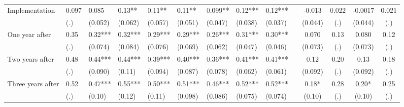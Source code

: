 \begin{tabular}{lccccrrrrrcccc}
Implementation & \multicolumn{1}{l}{0.097} & \multicolumn{1}{l}{0.085} & \multicolumn{1}{l}{0.13**} & \multicolumn{1}{l}{0.11**} & \multicolumn{1}{l}{0.11**} & \multicolumn{1}{l}{0.099**} & \multicolumn{1}{l}{0.12***} & \multicolumn{1}{l}{0.12***} &       & -0.013 & 0.022 & -0.0017 & 0.021 \\
      & \multicolumn{1}{l}{(.)} & \multicolumn{1}{l}{(0.052)} & \multicolumn{1}{l}{(0.062)} & \multicolumn{1}{l}{(0.057)} & \multicolumn{1}{l}{(0.051)} & \multicolumn{1}{l}{(0.047)} & \multicolumn{1}{l}{(0.038)} & \multicolumn{1}{l}{(0.037)} &       & (0.044) & (.)   & (0.044) & (.) \\
One year after & \multicolumn{1}{l}{0.35} & \multicolumn{1}{l}{0.32***} & \multicolumn{1}{l}{0.32***} & \multicolumn{1}{l}{0.29***} & \multicolumn{1}{l}{0.29***} & \multicolumn{1}{l}{0.26***} & \multicolumn{1}{l}{0.31***} & \multicolumn{1}{l}{0.30***} &       & 0.070 & 0.13  & 0.080 & 0.12 \\
      & \multicolumn{1}{l}{(.)} & \multicolumn{1}{l}{(0.074)} & \multicolumn{1}{l}{(0.084)} & \multicolumn{1}{l}{(0.076)} & \multicolumn{1}{l}{(0.069)} & \multicolumn{1}{l}{(0.062)} & \multicolumn{1}{l}{(0.047)} & \multicolumn{1}{l}{(0.046)} &       & (0.073) & (.)   & (0.073) & (.) \\
Two years after & \multicolumn{1}{l}{0.48} & \multicolumn{1}{l}{0.44***} & \multicolumn{1}{l}{0.44***} & \multicolumn{1}{l}{0.39***} & \multicolumn{1}{l}{0.40***} & \multicolumn{1}{l}{0.36***} & \multicolumn{1}{l}{0.41***} & \multicolumn{1}{l}{0.41***} &       & 0.12  & 0.20  & 0.13  & 0.18 \\
      & \multicolumn{1}{l}{(.)} & \multicolumn{1}{l}{(0.090)} & \multicolumn{1}{l}{(0.11)} & \multicolumn{1}{l}{(0.094)} & \multicolumn{1}{l}{(0.087)} & \multicolumn{1}{l}{(0.078)} & \multicolumn{1}{l}{(0.062)} & \multicolumn{1}{l}{(0.061)} &       & (0.092) & (.)   & (0.092) & (.) \\
Three years after & \multicolumn{1}{l}{0.52} & \multicolumn{1}{l}{0.47***} & \multicolumn{1}{l}{0.55***} & \multicolumn{1}{l}{0.50***} & \multicolumn{1}{l}{0.51***} & \multicolumn{1}{l}{0.46***} & \multicolumn{1}{l}{0.52***} & \multicolumn{1}{l}{0.52***} &       & 0.18* & 0.28  & 0.20* & 0.25 \\
      & \multicolumn{1}{l}{(.)} & \multicolumn{1}{l}{(0.10)} & \multicolumn{1}{l}{(0.12)} & \multicolumn{1}{l}{(0.11)} & \multicolumn{1}{l}{(0.098)} & \multicolumn{1}{l}{(0.086)} & \multicolumn{1}{l}{(0.075)} & \multicolumn{1}{l}{(0.074)} &       & (0.10) & (.)   & (0.10) & (.) \\

\end{tabular}
